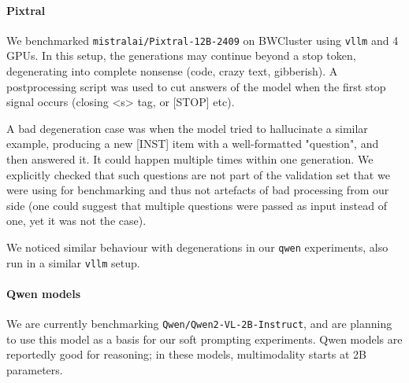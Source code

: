 \documentclass{article}
\begin{document}

 

\paragraph{Pixtral}

We benchmarked \texttt{mistralai/Pixtral-12B-2409} on BWCluster using \texttt{vllm} and 4 GPUs. In this setup, the generations may continue beyond a stop token, degenerating into complete nonsense (code, crazy text, gibberish). A postprocessing script was used to cut answers of the model when the first stop signal occurs (closing <s> tag, or [STOP] etc).

A bad degeneration case was when the model tried to hallucinate a similar example, producing a new [INST] item with a well-formatted "question", and then answered it. It could happen multiple times within one generation. We explicitly checked that such questions are not part of the validation set that we were using for benchmarking and thus not artefacts of bad processing from our side (one could suggest that multiple questions were passed as input instead of one, yet it was not the case). 

We noticed similar behaviour with degenerations in our \texttt{qwen} experiments, also run in a similar \texttt{vllm} setup. 


\paragraph{Qwen models} 
We are currently benchmarking \texttt{Qwen/Qwen2-VL-2B-Instruct}, and are planning to use this model as a basis for our soft prompting experiments. Qwen models are reportedly good for reasoning; in these models, multimodality starts at 2B parameters. 
\end{document}
